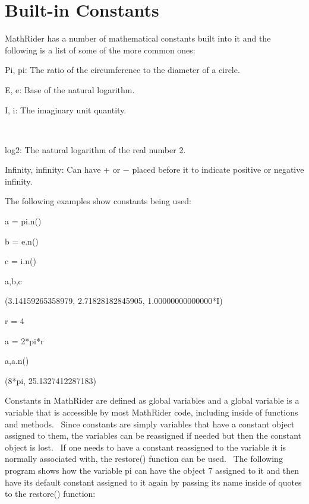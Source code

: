 \documentclass[12pt,twoside]{book}
\begin{document}
\section[Built{}-in Constants]{Built{}-in Constants}
MathRider has a number of mathematical constants built into it and the
following is a list of some of the more common ones:


\bigskip

Pi, pi: The ratio of the circumference to the diameter of a circle.


\bigskip

E, e: Base of the natural logarithm.


\bigskip

I, i: The imaginary unit quantity.

\ \ \ \ \ 

log2: The natural logarithm of the real number 2.


\bigskip

Infinity, infinity: Can have + or $-$ placed before it to indicate
positive or negative infinity.


\bigskip

The following examples show constants being used:


\bigskip

a = pi.n()

b = e.n()

c = i.n()

a,b,c

{\textbar}

(3.14159265358979, 2.71828182845905, 1.00000000000000*I)


\bigskip

r = 4

a = 2*pi*r

a,a.n()

{\textbar}

(8*pi, 25.1327412287183)

Constants in MathRider are defined as global variables and a global
variable is a variable that is accessible by most MathRider code,
including inside of functions and methods. \ Since constants are simply
variables that have a constant object assigned to them, the variables
can be reassigned if needed but then the constant object is lost. \ If
one needs to have a constant reassigned to the variable it is normally
associated with, the restore() function can be used. \ The following
program shows how the variable pi can have the object 7 assigned to it
and then have its default constant assigned to it again by passing its
name inside of quotes to the restore() function:
\end{document}
